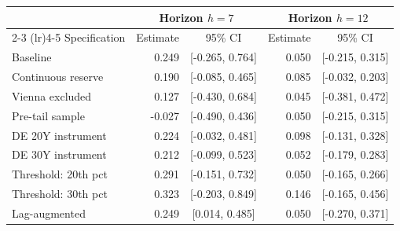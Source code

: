 \begin{tabular}{l r c r c}
\toprule
 & \multicolumn{2}{c}{Horizon $h = 7$} & \multicolumn{2}{c}{Horizon $h = 12$} \\
\cmidrule(lr){2-3} \cmidrule(lr){4-5}
Specification & Estimate & 95\% CI & Estimate & 95\% CI \\
\midrule
Baseline & 0.249 & [-0.265, 0.764] & 0.050 & [-0.215, 0.315] \\
Continuous reserve & 0.190 & [-0.085, 0.465] & 0.085 & [-0.032, 0.203] \\
Vienna excluded & 0.127 & [-0.430, 0.684] & 0.045 & [-0.381, 0.472] \\
Pre-tail sample & -0.027 & [-0.490, 0.436] & 0.050 & [-0.215, 0.315] \\
DE 20Y instrument & 0.224 & [-0.032, 0.481] & 0.098 & [-0.131, 0.328] \\
DE 30Y instrument & 0.212 & [-0.099, 0.523] & 0.052 & [-0.179, 0.283] \\
Threshold: 20th pct & 0.291 & [-0.151, 0.732] & 0.050 & [-0.165, 0.266] \\
Threshold: 30th pct & 0.323 & [-0.203, 0.849] & 0.146 & [-0.165, 0.456] \\
Lag-augmented & 0.249 & [0.014, 0.485] & 0.050 & [-0.270, 0.371] \\
\bottomrule
\end{tabular}
